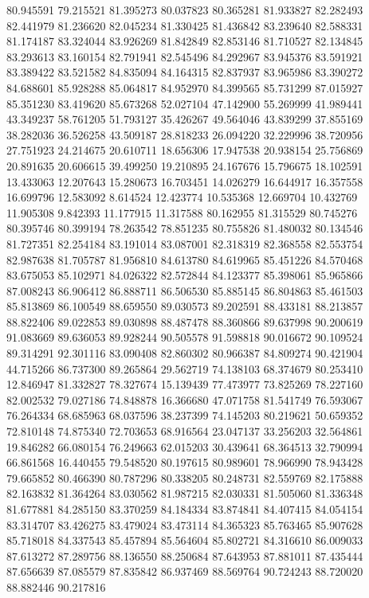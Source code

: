 80.945591
79.215521
81.395273
80.037823
80.365281
81.933827
82.282493
82.441979
81.236620
82.045234
81.330425
81.436842
83.239640
82.588331
81.174187
83.324044
83.926269
81.842849
82.853146
81.710527
82.134845
83.293613
83.160154
82.791941
82.545496
84.292967
83.945376
83.591921
83.389422
83.521582
84.835094
84.164315
82.837937
83.965986
83.390272
84.688601
85.928288
85.064817
84.952970
84.399565
85.731299
87.015927
85.351230
83.419620
85.673268
52.027104
47.142900
55.269999
41.989441
43.349237
58.761205
51.793127
35.426267
49.564046
43.839299
37.855169
38.282036
36.526258
43.509187
28.818233
26.094220
32.229996
38.720956
27.751923
24.214675
20.610711
18.656306
17.947538
20.938154
25.756869
20.891635
20.606615
39.499250
19.210895
24.167676
15.796675
18.102591
13.433063
12.207643
15.280673
16.703451
14.026279
16.644917
16.357558
16.699796
12.583092
8.614524
12.423774
10.535368
12.669704
10.432769
11.905308
9.842393
11.177915
11.317588
80.162955
81.315529
80.745276
80.395746
80.399194
78.263542
78.851235
80.755826
81.480032
80.134546
81.727351
82.254184
83.191014
83.087001
82.318319
82.368558
82.553754
82.987638
81.705787
81.956810
84.613780
84.619965
85.451226
84.570468
83.675053
85.102971
84.026322
82.572844
84.123377
85.398061
85.965866
87.008243
86.906412
86.888711
86.506530
85.885145
86.804863
85.461503
85.813869
86.100549
88.659550
89.030573
89.202591
88.433181
88.213857
88.822406
89.022853
89.030898
88.487478
88.360866
89.637998
90.200619
91.083669
89.636053
89.928244
90.505578
91.598818
90.016672
90.109524
89.314291
92.301116
83.090408
82.860302
80.966387
84.809274
90.421904
44.715266
86.737300
89.265864
29.562719
74.138103
68.374679
80.253410
12.846947
81.332827
78.327674
15.139439
77.473977
73.825269
78.227160
82.002532
79.027186
74.848878
16.366680
47.071758
81.541749
76.593067
76.264334
68.685963
68.037596
38.237399
74.145203
80.219621
50.659352
72.810148
74.875340
72.703653
68.916564
23.047137
33.256203
32.564861
19.846282
66.080154
76.249663
62.015203
30.439641
68.364513
32.790994
66.861568
16.440455
79.548520
80.197615
80.989601
78.966990
78.943428
79.665852
80.466390
80.787296
80.338205
80.248731
82.559769
82.175888
82.163832
81.364264
83.030562
81.987215
82.030331
81.505060
81.336348
81.677881
84.285150
83.370259
84.184334
83.874841
84.407415
84.054154
83.314707
83.426275
83.479024
83.473114
84.365323
85.763465
85.907628
85.718018
84.337543
85.457894
85.564604
85.802721
84.316610
86.009033
87.613272
87.289756
88.136550
88.250684
87.643953
87.881011
87.435444
87.656639
87.085579
87.835842
86.937469
88.569764
90.724243
88.720020
88.882446
90.217816
